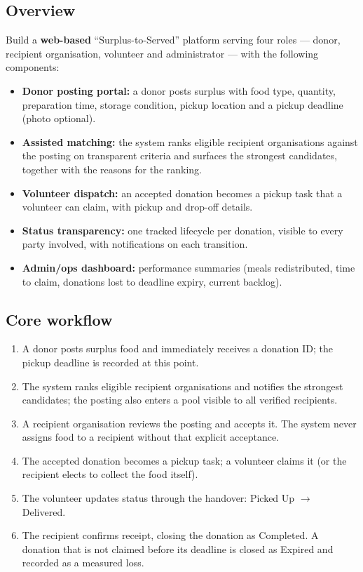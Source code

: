 \documentclass[11pt,a4paper]{article}
\begin{document}
\subsection{Overview}
Build a \textbf{web-based} ``Surplus-to-Served'' platform serving four roles --- donor, recipient organisation, volunteer and administrator --- with the following components:
\begin{itemize}[leftmargin=0.7cm]
    \item \textbf{Donor posting portal:} a donor posts surplus with food type, quantity, preparation time, storage condition, pickup location and a pickup deadline (photo optional).
    \item \textbf{Assisted matching:} the system ranks eligible recipient organisations against the posting on transparent criteria and surfaces the strongest candidates, together with the reasons for the ranking.
    \item \textbf{Volunteer dispatch:} an accepted donation becomes a pickup task that a volunteer can claim, with pickup and drop-off details.
    \item \textbf{Status transparency:} one tracked lifecycle per donation, visible to every party involved, with notifications on each transition.
    \item \textbf{Admin/ops dashboard:} performance summaries (meals redistributed, time to claim, donations lost to deadline expiry, current backlog).
\end{itemize}

\subsection{Core workflow}
\begin{enumerate}[leftmargin=0.7cm]
    \item A donor posts surplus food and immediately receives a donation ID; the pickup deadline is recorded at this point.
    \item The system ranks eligible recipient organisations and notifies the strongest candidates; the posting also enters a pool visible to all verified recipients.
    \item A recipient organisation reviews the posting and accepts it. The system never assigns food to a recipient without that explicit acceptance.
    \item The accepted donation becomes a pickup task; a volunteer claims it (or the recipient elects to collect the food itself).
    \item The volunteer updates status through the handover: Picked Up $\rightarrow$ Delivered.
    \item The recipient confirms receipt, closing the donation as Completed. A donation that is not claimed before its deadline is closed as Expired and recorded as a measured loss.
\end{enumerate}
\end{document}
